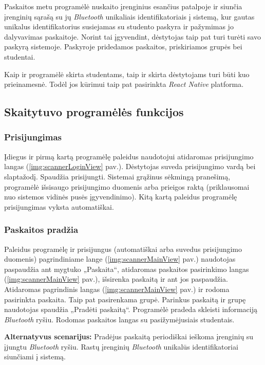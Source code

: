 \documentclass{VUMIFPSbakalaurinis}
\begin{document}
Paskaitos metu programėlė nuskaito įrenginius esančius patalpoje ir siunčia įrenginių sąrašą su jų \textit{Bluetooth} unikaliais identifikatoriais į sistemą, kur gautas unikalus identifikatorius susiejamas su studento paskyra ir pažymimas jo dalyvavimas paskaitoje. Norint tai įgyvendint, dėstytojas taip pat turi turėti savo paskyrą sistemoje. Paskyroje pridedamos paskaitos, priskiriamos grupės bei studentai.

Kaip ir programėlė skirta studentams, taip ir skirta dėstytojams turi būti kuo prieinamesnė. Todėl jos kūrimui taip pat pasirinkta \textit{React Native} platforma.

\subsection{Skaitytuvo programėlės funkcijos}

\subsubsection{Prisijungimas}

Įdiegus ir pirmą kartą programėlę paleidus naudotojui atidaromas prisijungimo langas (\ref{img:scannerLoginView} pav.). Dėstytojas suveda prisijungimo vardą bei slaptažodį. Spaudžia prisijungti. Sistemai grąžinus sėkmingą pranešimą, programėlė išsisaugo prisijungimo duomenis arba prieigos raktą (priklausomai nuo sistemos vidinės pusės įgyvendinimo). Kitą kartą paleidus programėlę prisijungimas vyksta automatiškai.

\subsubsection{Paskaitos pradžia}

Paleidus programėlę ir prisijungus (automatiškai arba suvedus prisijungimo duomenis) pagrindiniame lange (\ref{img:scannerMainView} pav.) naudotojas paspaudžia ant mygtuko „Paskaita“, atidaromas paskaitos pasirinkimo langas (\ref{img:scannerMainView} pav.), išsirenka paskaitą ir ant jos paspaudžia. Atidaromas pagrindinis langas (\ref{img:scannerMainView} pav.) ir rodoma pasirinkta paskaita. Taip pat pasirenkama grupė. Parinkus paskaitą ir grupę naudotojas spaudžia „Pradėti paskaitą“. Programėlė pradeda skleisti informaciją \textit{Bluetooth} ryšiu. Rodomas paskaitos langas su pasižymėjusiais studentais.

\textbf{Alternatyvus scenarijus:} Pradėjus paskaitą periodiškai ieškoma įrenginių su įjungtu \textit{Bluetooth} ryšiu. Rastų įrenginių \textit{Bluetooth} unikalūs identifikatoriai siunčiami į sistemą.
\end{document}
